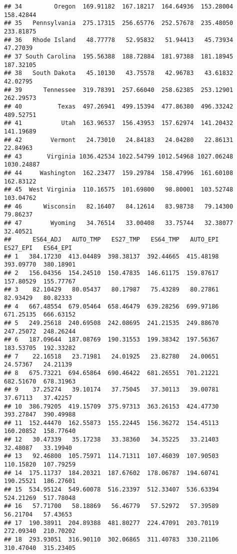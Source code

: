 \documentclass[
]{article}
\begin{document}
\begin{verbatim}
## 34         Oregon  169.91182  167.18217  164.64936  153.28004  158.42844
## 35   Pennsylvania  275.17315  256.65776  252.57678  235.48050  233.81875
## 36   Rhode Island   48.77778   52.95832   51.94413   45.73934   47.27039
## 37 South Carolina  195.56388  188.72884  181.97388  181.18945  187.32105
## 38   South Dakota   45.10130   43.75578   42.96783   43.61832   42.02795
## 39      Tennessee  319.78391  257.66040  258.62385  253.12901  262.29573
## 40          Texas  497.26941  499.15394  477.86380  496.33242  489.52751
## 41           Utah  163.96537  156.43953  157.62974  141.20432  141.19689
## 42        Vermont   24.73010   24.84183   24.04280   22.86131   22.84963
## 43       Virginia 1036.42534 1022.54799 1012.54968 1027.06248 1030.24887
## 44     Washington  162.23477  159.29784  158.47996  161.60108  162.83122
## 45  West Virginia  110.16575  101.69800   98.80001  103.52748  103.04762
## 46      Wisconsin   82.16407   84.12614   83.98738   79.14300   79.86237
## 47        Wyoming   34.76514   33.00408   33.75744   32.38077   32.40521
##      ES64_ADJ   AUTO_TMP   ES27_TMP   ES64_TMP   AUTO_EPI   ES27_EPI   ES64_EPI
## 1   384.17230  413.04489  398.38137  392.44665  415.48198  393.09770  380.18901
## 2   156.04356  154.24510  150.47835  146.61175  159.87617  157.80529  155.77767
## 3    82.10429   80.05437   80.17987   75.43289   80.27861   82.93429   80.82333
## 4   667.48554  679.05464  658.46479  639.28256  699.97186  671.25135  666.63152
## 5   249.25618  240.69508  242.08695  241.21535  249.88670  247.25072  248.26244
## 6   187.09644  187.08769  190.31553  199.38342  197.56367  183.53705  192.33282
## 7    22.16518   23.71981   24.01925   23.82780   24.00651   24.57367   24.21139
## 8   675.73221  694.65864  690.46422  681.26551  701.21221  682.51670  678.31963
## 9    37.25274   39.10174   37.75045   37.30113   39.00781   37.67113   37.42257
## 10  386.79205  419.15709  375.97313  363.26153  424.47730  393.27847  390.49988
## 11  152.44470  162.55873  155.22445  156.36272  154.45113  160.20852  158.77640
## 12   30.47339   35.17238   33.38360   34.35225   33.21403   32.48087   33.19940
## 13   92.46800  105.75971  114.71311  107.46039  107.90503  110.15820  107.79259
## 14  175.11737  184.20321  187.67602  178.06787  194.60741  190.25521  186.27601
## 15  534.95124  549.60078  516.23397  512.33407  536.63394  524.21269  517.78048
## 16   57.71700   58.18869   56.46779   57.52972   57.39589   56.21704   57.43653
## 17  190.38911  204.89388  481.80277  224.47091  203.70119  272.09340  210.70202
## 18  293.93051  316.90110  302.06865  311.40783  330.21106  310.47040  315.23405

\end{verbatim}
\end{document}
